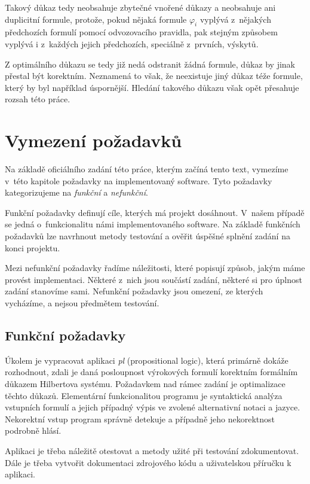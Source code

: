 \documentclass[thesis=B,czech,hidelinks]{thesis}[2012/06/26]
\begin{document}
Takový důkaz tedy neobsahuje zbytečné vnořené důkazy a neobsahuje ani duplicitní formule, protože, pokud nějaká formule $\varphi_i$ vyplývá z~nějakých předchozích formulí pomocí odvozovacího pravidla, pak stejným způsobem vyplývá i z~každých jejich předchozích, speciálně z~prvních, výskytů.

Z optimálního důkazu se tedy již nedá odstranit žádná formule, důkaz by jinak přestal být korektním. Neznamená to však, že neexistuje jiný důkaz téže formule, který by byl například úspornější. Hledání takového důkazu však opět přesahuje rozsah této práce.

%
%
%

\chapter{Vymezení požadavků}

Na základě oficiálního zadání této práce, kterým začíná tento text, vymezíme v~této kapitole požadavky na implementovaný software. Tyto požadavky kategorizujeme na \emph{funkční} a \emph{nefunkční}.

Funkční požadavky definují cíle, kterých má projekt dosáhnout. V~našem případě se jedná o~funkcionalitu námi implementovaného software. Na základě funkčních požadavků lze navrhnout metody testování a ověřit úspěšné splnění zadání na konci projektu.

Mezi nefunkční požadavky řadíme náležitosti, které popisují způsob, jakým máme provést implementaci. Některé z~nich jsou součástí zadání, některé si pro úplnost zadání stanovíme sami. Nefunkční požadavky jsou omezení, ze kterých vycházíme, a nejsou předmětem testování.

\section{Funkční požadavky}

Úkolem je vypracovat aplikaci \emph{pl} (propositional logic), která primárně dokáže rozhodnout, zdali je daná posloupnost výrokových formulí korektním formálním důkazem Hilbertova systému. Požadavkem nad rámec zadání je optimalizace těchto důkazů. Elementární funkcionalitou programu je syntaktická analýza vstupních formulí a jejich případný výpis ve zvolené alternativní notaci a jazyce. Nekorektní vstup program správně detekuje a případně jeho nekorektnost podrobně hlásí.

Aplikaci je třeba náležitě otestovat a metody užité při testování zdokumentovat. Dále je třeba vytvořit dokumentaci zdrojového kódu a uživatelskou příručku k aplikaci.
\end{document}
